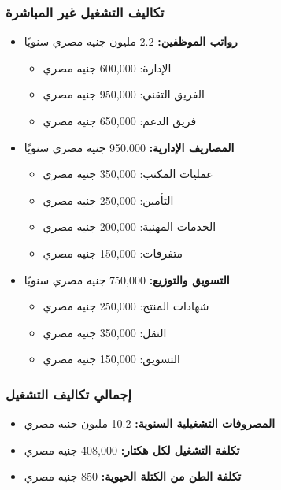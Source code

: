 \subsubsection{تكاليف التشغيل غير المباشرة}
\begin{itemize}
    \item \textbf{رواتب الموظفين:} 2.2 مليون جنيه مصري سنويًا
    \begin{itemize}
        \item الإدارة: 600,000 جنيه مصري
        \item الفريق التقني: 950,000 جنيه مصري
        \item فريق الدعم: 650,000 جنيه مصري
    \end{itemize}
    
    \item \textbf{المصاريف الإدارية:} 950,000 جنيه مصري سنويًا
    \begin{itemize}
        \item عمليات المكتب: 350,000 جنيه مصري
        \item التأمين: 250,000 جنيه مصري
        \item الخدمات المهنية: 200,000 جنيه مصري
        \item متفرقات: 150,000 جنيه مصري
    \end{itemize}
    
    \item \textbf{التسويق والتوزيع:} 750,000 جنيه مصري سنويًا
    \begin{itemize}
        \item شهادات المنتج: 250,000 جنيه مصري
        \item النقل: 350,000 جنيه مصري
        \item التسويق: 150,000 جنيه مصري
    \end{itemize}
\end{itemize}

\subsubsection{إجمالي تكاليف التشغيل}
\begin{itemize}
    \item \textbf{المصروفات التشغيلية السنوية:} 10.2 مليون جنيه مصري
    \item \textbf{تكلفة التشغيل لكل هكتار:} 408,000 جنيه مصري
    \item \textbf{تكلفة الطن من الكتلة الحيوية:} 850 جنيه مصري
\end{itemize}

